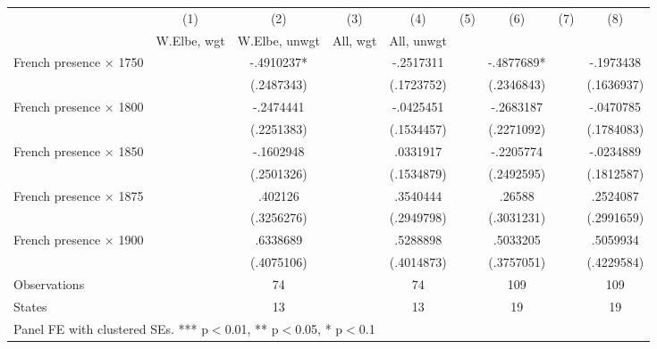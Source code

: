 \begin{adjustbox}{max width=\textwidth}
\begin{tabular}{lcccccccc}
\toprule
 & (1) & (2) & (3) & (4) & (5) & (6) & (7) & (8) \\
 & W.Elbe, wgt & W.Elbe, unwgt & All, wgt & All, unwgt \\
\midrule
French presence $\times$ 1750 &  & -.4910237* &  & -.2517311 &  & -.4877689* &  & -.1973438 \\
 &  & (.2487343) &  & (.1723752) &  & (.2346843) &  & (.1636937) \\[0.3em]
French presence $\times$ 1800 &  & -.2474441 &  & -.0425451 &  & -.2683187 &  & -.0470785 \\
 &  & (.2251383) &  & (.1534457) &  & (.2271092) &  & (.1784083) \\[0.3em]
French presence $\times$ 1850 &  & -.1602948 &  & .0331917 &  & -.2205774 &  & -.0234889 \\
 &  & (.2501326) &  & (.1534879) &  & (.2492595) &  & (.1812587) \\[0.3em]
French presence $\times$ 1875 &  & .402126 &  & .3540444 &  & .26588 &  & .2524087 \\
 &  & (.3256276) &  & (.2949798) &  & (.3031231) &  & (.2991659) \\[0.3em]
French presence $\times$ 1900 &  & .6338689 &  & .5288898 &  & .5033205 &  & .5059934 \\
 &  & (.4075106) &  & (.4014873) &  & (.3757051) &  & (.4229584) \\[0.3em]
\midrule
Observations &  & 74 &  & 74 &  & 109 &  & 109 \\
States &  & 13 &  & 13 &  & 19 &  & 19 \\
\bottomrule
\multicolumn{9}{l}{\footnotesize Panel FE with clustered SEs. *** p$<$0.01, ** p$<$0.05, * p$<$0.1} \\
\end{tabular}
\end{adjustbox}
